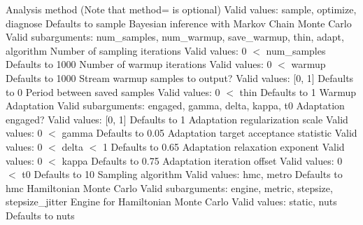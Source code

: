 \begin{description}
  {Analysis method (Note that method= is optional)}
  {Valid values: sample, optimize, diagnose}
  {Defaults to sample}
%
    {Bayesian inference with Markov Chain Monte Carlo}
    {Valid subarguments: num\_samples, num\_warmup, save\_warmup, thin, adapt, algorithm}
%
      {Number of sampling iterations}
      {Valid values: 0 $<$ num\_samples}
      {Defaults to 1000}
%
      {Number of warmup iterations}
      {Valid values: 0 $<$ warmup}
      {Defaults to 1000}
%
      {Stream warmup samples to output?}
      {Valid values: [0, 1]}
      {Defaults to 0}
%
      {Period between saved samples}
      {Valid values: 0 $<$ thin}
      {Defaults to 1}
%
      {Warmup Adaptation}
      {Valid subarguments: engaged, gamma, delta, kappa, t0}
%
        {Adaptation engaged?}
        {Valid values: [0, 1]}
        {Defaults to 1}
%
        {Adaptation regularization scale}
        {Valid values: 0 $<$ gamma}
        {Defaults to 0.05}
%
        {Adaptation target acceptance statistic}
        {Valid values: 0 $<$ delta $<$ 1}
        {Defaults to 0.65}
%
        {Adaptation relaxation exponent}
        {Valid values: 0 $<$ kappa}
        {Defaults to 0.75}
%
        {Adaptation iteration offset}
        {Valid values: 0 $<$ t0}
        {Defaults to 10}
%
      {Sampling algorithm}
      {Valid values: hmc, metro}
      {Defaults to hmc}
%
        {Hamiltonian Monte Carlo}
        {Valid subarguments: engine, metric, stepsize, stepsize\_jitter}
%
          {Engine for Hamiltonian Monte Carlo}
          {Valid values: static, nuts}
          {Defaults to nuts}

\end{description}
